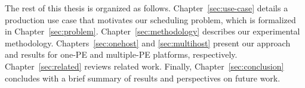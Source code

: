 The rest of this thesis is organized as follows. Chapter~\ref{sec:use-case}
details a production use case that motivates our scheduling problem, which
is formalized in Chapter~\ref{sec:problem}.  Chapter~\ref{sec:methodology}
describes our experimental methodology. Chapters~\ref{sec:onehost} and
\ref{sec:multihost} present our approach and results for one-PE and
multiple-PE platforms, respectively. 
Chapter~\ref{sec:related} reviews related work.  Finally,
Chapter~\ref{sec:conclusion} concludes with a brief summary of results and
perspectives on future work.
